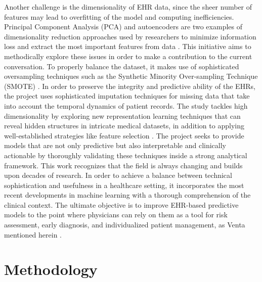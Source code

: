 \documentclass[manuscript,screen,]{acmart}
\begin{document}
Another challenge is the dimensionality of EHR data, since the sheer number of features may lead to overfitting of the model and computing inefficiencies. Principal Component Analysis (PCA) and autoencoders are two examples of dimensionality reduction approaches used by researchers to minimize information loss and extract the most important features from data \cite{ayesha2020overview}.
This initiative aims to methodically explore these issues in order to make a contribution to the current conversation. To properly balance the dataset, it makes use of sophisticated oversampling techniques such as the Synthetic Minority Over-sampling Technique (SMOTE) \cite{Gosain2017}. In order to preserve the integrity and predictive ability of the EHRs, the project uses sophisticated imputation techniques for missing data that take into account the temporal dynamics of patient records.
The study tackles high dimensionality by exploring new representation learning techniques that can reveal hidden structures in intricate medical datasets, in addition to applying well-established strategies like feature selection \cite{YourUniqueID}. The project seeks to provide models that are not only predictive but also interpretable and clinically actionable by thoroughly validating these techniques inside a strong analytical framework.
This work recognizes that the field is always changing and builds upon decades of research. In order to achieve a balance between technical sophistication and usefulness in a healthcare setting, it incorporates the most recent developments in machine learning with a thorough comprehension of the clinical context. The ultimate objective is to improve EHR-based predictive models to the point where physicians can rely on them as a tool for risk assessment, early diagnosis, and individualized patient management, as Venta mentioned herein \cite{Venta2017}.

\section{Methodology}
\end{document}
